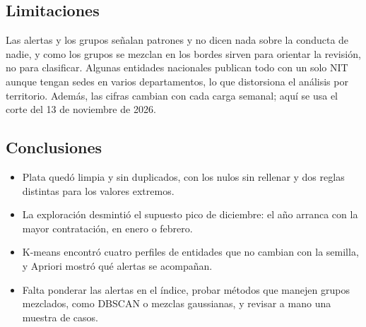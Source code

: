 \subsection{Limitaciones}
Las alertas y los grupos señalan patrones y no dicen nada sobre la conducta de nadie, y como los grupos se mezclan en los bordes sirven para orientar la revisión, no para clasificar. Algunas entidades nacionales publican todo con un solo NIT aunque tengan sedes en varios departamentos, lo que distorsiona el análisis por territorio. Además, las cifras cambian con cada carga semanal; aquí se usa el corte del 13 de noviembre de 2026.

\subsection{Conclusiones}
\begin{itemize}
  \item Plata quedó limpia y sin duplicados, con los nulos sin rellenar y dos reglas distintas para los valores extremos.
  \item La exploración desmintió el supuesto pico de diciembre: el año arranca con la mayor contratación, en enero o febrero.
  \item K-means encontró cuatro perfiles de entidades que no cambian con la semilla, y Apriori mostró qué alertas se acompañan.
  \item Falta ponderar las alertas en el índice, probar métodos que manejen grupos mezclados, como DBSCAN o mezclas gaussianas, y revisar a mano una muestra de casos.
\end{itemize}
